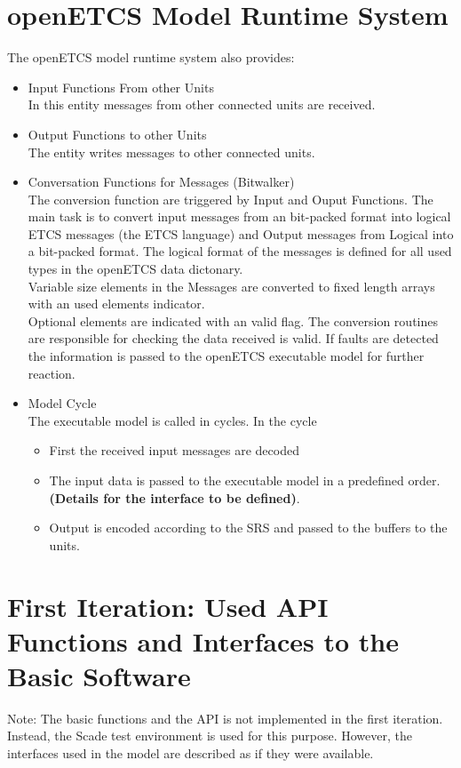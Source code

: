 \documentclass{template/openetcs_report}
\begin{document}
\section{openETCS Model Runtime System}
The openETCS model runtime system also provides:

\begin{itemize}
\item Input Functions From other Units\\
In this entity messages from other connected units are received.
\item Output Functions to other Units\\
The entity writes messages to other connected units.
\item Conversation Functions for Messages (Bitwalker)\\
The conversion function are triggered by Input and Ouput Functions. The main task is to convert input messages from an bit-packed format into logical ETCS messages (the ETCS language) and Output messages from Logical into a bit-packed format. The logical format of the messages is defined for all used types in the openETCS data dictonary. \\
Variable size elements in the Messages are converted to fixed length arrays with an used elements indicator.\\
Optional elements are indicated with an valid flag.
The conversion routines are responsible for checking the data received is valid. If  faults are detected the information is passed to the openETCS executable model for further reaction. 
\item Model Cycle\\
The executable model is called in cycles. In the cycle 
\begin{itemize}
\item First the received input messages are decoded
\item The input data is passed to the executable model in a predefined order. \textbf{(Details for the interface to be defined)}.
\item Output is encoded according to the SRS and passed to the  buffers to the units.
\end{itemize}

\end{itemize}




\section{First Iteration: Used API Functions and Interfaces to the Basic Software}
Note: The basic functions and the API is not implemented in the first iteration. Instead, the Scade test environment is used for this purpose. However, the interfaces used in the model are described as if they were available.
\end{document}
